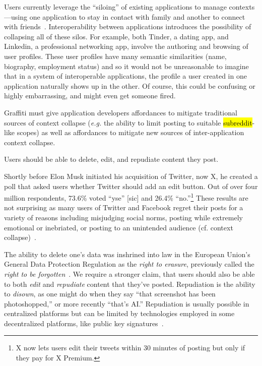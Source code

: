 Users currently leverage the ``siloing'' of existing applications to manage contexts---using
one application to stay in contact with family and another to connect with friends~\cite{whatsappforfamily}.
Interoperability between applications introduces the possibility
of collapsing all of these silos.
For example, both Tinder, a dating app, and Linkedin, a professional networking app, involve the authoring
and browsing of user profiles.
These user profiles have many semantic similarities (name, biography, employment status) and so
it would not be unreasonable to imagine that in a system of interoperable applications,
the profile a user created in one application
naturally shows up in the other.
Of course, this could be confusing or highly embarrassing, and might even get someone fired.

Graffiti must give application developers affordances to mitigate traditional sources
of context collapse (\emph{e.g.} the ability to limit posting to suitable \hl{subreddit}-like scopes)
as well as affordances to mitigate new sources of inter-application context collapse.


\begin{requirement}[Forgiving]
\label{requirements:forgiving}
    Users should be able to delete, edit, and repudiate content they post.
\end{requirement}

Shortly before Elon Musk initiated his acquisition of Twitter, now X,
he created a poll that asked users whether Twitter should add an edit button.
Out of over four million respondents, 73.6\% voted ``yse'' [sic] and 26.4\% ``no.''\footnote{
  X now lets users edit their tweets within 30 minutes of posting but only
  if they pay for X Premium.
} These results are not surprising as many users of Twitter and Facebook regret
their posts for a variety of reasons
including misjudging social norms, posting while extremely emotional or inebriated,
or posting to an unintended audience (cf. context collapse)~\cite{regret, regrettwitter}.

The ability to delete one's data was inshrined into law in the European Union's
General Data Protection Regulation as
the \emph{right to erasure}, previously called the \emph{right to be forgotten}~\cite{gdpr}.
We require a stronger claim, that users should also be able to both \emph{edit}
and \emph{repudiate} content that they've posted. Repudiation is the ability to \emph{disown},
as one might do when they say ``that screenshot has been photoshopped,''
or more recently ``that's AI.'' Repudiation is usually possible in centralized platforms
but can be limited by technologies employed in some decentralized platforms,
like public key signatures~\cite{offtherecord}.

